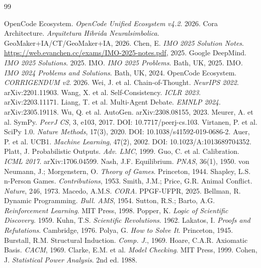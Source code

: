 \documentclass[5p]{elsarticle}
\begin{document}
\begin{thebibliography}{99}

 OpenCode Ecosystem. \textit{OpenCode Unified Ecosystem v4.2}. 2026.
 Cora Architecture. \textit{Arquitetura Hibrida Neuralsimbolica}. GeoMaker+IA/CT/GeoMaker+IA, 2026.
 Chen, E. \textit{IMO 2025 Solution Notes}. \url{https://web.evanchen.cc/exams/IMO-2025-notes.pdf}, 2025.
 Google DeepMind. \textit{IMO 2025 Solutions}. 2025.
 IMO. \textit{IMO 2025 Problems}. Bath, UK, 2025.
 IMO. \textit{IMO 2024 Problems and Solutions}. Bath, UK, 2024.
 OpenCode Ecosystem. \textit{CORRIGENDUM v2}. 2026.
 Wei, J. et al. Chain-of-Thought. \textit{NeurIPS 2022}. arXiv:2201.11903.
 Wang, X. et al. Self-Consistency. \textit{ICLR 2023}. arXiv:2203.11171.
 Liang, T. et al. Multi-Agent Debate. \textit{EMNLP 2024}. arXiv:2305.19118.
 Wu, Q. et al. AutoGen. arXiv:2308.08155, 2023.
 Meurer, A. et al. SymPy. \textit{PeerJ CS}, 3, e103, 2017. DOI: 10.7717/peerj-cs.103.
 Virtanen, P. et al. SciPy 1.0. \textit{Nature Methods}, 17(3), 2020. DOI: 10.1038/s41592-019-0686-2.
 Auer, P. et al. UCB1. \textit{Machine Learning}, 47(2), 2002. DOI: 10.1023/A:1013689704352.
 Platt, J. Probabilistic Outputs. \textit{Adv. LMC}, 1999.
 Guo, C. et al. Calibration. \textit{ICML 2017}. arXiv:1706.04599.
 Nash, J.F. Equilibrium. \textit{PNAS}, 36(1), 1950.
 von Neumann, J.; Morgenstern, O. \textit{Theory of Games}. Princeton, 1944.
 Shapley, L.S. n-Person Games. \textit{Contributions}, 1953.
 Smith, J.M.; Price, G.R. Animal Conflict. \textit{Nature}, 246, 1973.
 Macedo, A.M.S. \textit{CORA}. PPGF-UFPR, 2025.
 Bellman, R. Dynamic Programming. \textit{Bull. AMS}, 1954.
 Sutton, R.S.; Barto, A.G. \textit{Reinforcement Learning}. MIT Press, 1998.
 Popper, K. \textit{Logic of Scientific Discovery}. 1959.
 Kuhn, T.S. \textit{Scientific Revolutions}. 1962.
 Lakatos, I. \textit{Proofs and Refutations}. Cambridge, 1976.
 Polya, G. \textit{How to Solve It}. Princeton, 1945.
 Burstall, R.M. Structural Induction. \textit{Comp. J.}, 1969.
 Hoare, C.A.R. Axiomatic Basis. \textit{CACM}, 1969.
 Clarke, E.M. et al. \textit{Model Checking}. MIT Press, 1999.
 Cohen, J. \textit{Statistical Power Analysis}. 2nd ed. 1988.


\end{thebibliography}
\end{document}
